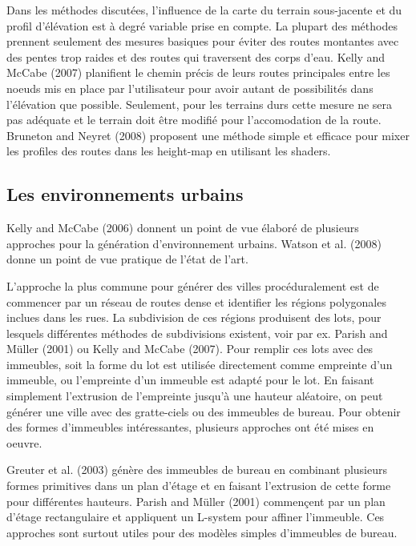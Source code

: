 \documentclass[11pt]{article}
\begin{document}
Dans les méthodes discutées, l'influence de la carte du terrain sous-jacente et du profil d'élévation est à degré variable prise en compte. La plupart des méthodes prennent seulement des mesures basiques pour éviter des routes montantes avec des pentes trop raides et des routes qui traversent des corps d'eau. Kelly and McCabe (2007) planifient le chemin précis de leurs routes principales entre les noeuds mis en place par l'utilisateur pour avoir autant de possibilités dans l'élévation que possible. Seulement, pour les terrains durs cette mesure ne sera pas adéquate et le terrain doit être modifié pour l'accomodation de la route. Bruneton and Neyret (2008) proposent une méthode simple et efficace pour mixer les profiles des routes dans les height-map en utilisant les shaders.

\subsection{Les environnements urbains}

Kelly and McCabe (2006) donnent un point de vue élaboré de plusieurs approches pour la génération d'environnement urbains. Watson et al. (2008) donne un point de vue pratique de l'état de l'art. \newline

L'approche la plus commune pour générer des villes procéduralement est de commencer par un réseau de routes dense et identifier les régions polygonales inclues dans les rues. La subdivision de ces régions produisent des lots, pour lesquels différentes méthodes de subdivisions existent, voir par ex. Parish and Müller (2001) ou Kelly and McCabe (2007). Pour remplir ces lots avec des immeubles, soit la forme du lot est utilisée directement comme empreinte d'un immeuble, ou l'empreinte d'un immeuble est adapté pour le lot. En faisant simplement l'extrusion de l'empreinte jusqu'à une hauteur aléatoire, on peut générer une ville avec des gratte-ciels ou des immeubles de bureau. Pour obtenir des formes d'immeubles intéressantes, plusieurs approches ont été mises en oeuvre.\newline

Greuter et al. (2003) génère des immeubles de bureau en combinant plusieurs formes primitives dans un plan d'étage et en faisant l'extrusion de cette forme pour différentes hauteurs. Parish and Müller (2001) commençent par un plan d'étage rectangulaire et appliquent un L-system pour affiner l'immeuble. Ces approches sont surtout utiles pour des modèles simples d'immeubles de bureau.  \newline
\end{document}

